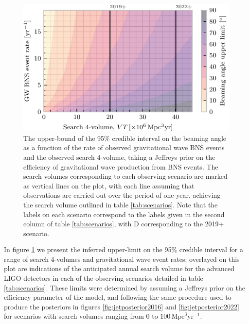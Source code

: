\documentclass[twocolumn]{aastex61}
\newcommand{\mpc}{\mathrm{Mpc}}
\newcommand{\yr}{\mathrm{yr}}
\begin{document}
\begin{figure}
\centering
\includegraphics[width=\linewidth]{volume_v_nevents.pdf}
\caption{\label{fig:volumevevents} The upper-bound of the 95\%
  credible interval on the beaming angle as a function of the rate of
  observed gravitational wave BNS events and the observed search
  4-volume, taking a Jeffreys prior on the efficiency of gravitational
  wave production from BNS events. The search volumes corresponding to
  each observing scenario are marked as vertical lines on the plot,
  with each line assuming that observations are carried out over the
  period of one year, achieving the search volume outlined in table
  \ref{tab:scenarios}. Note that the labels on each scenario
  correspond to the labels given in the second column of table
  \ref{tab:scenarios}, with D corresponding to the 2019+ scenario.}
\end{figure}

In figure \ref{fig:volumevevents} we present the inferred upper-limit
on the 95\% credible interval for a range of search 4-volumes and
gravitational wave event rates; overlayed on this plot are indications
of the anticipated annual search volume for the advanced LIGO
detectors in each of the observing scenarios detailed in table
\ref{tab:scenarios}. These limits were determined by assuming a
Jeffreys prior on the efficiency parameter of the model, and following
the same procedure used to produce the posteriors in figures
\ref{fig:jetposterior2016} and \ref{fig:jetposterior2022} for scenarios with
search volumes ranging from $0$ to $100\, \mpc^3 \yr^{-1}$. 
\end{document}
